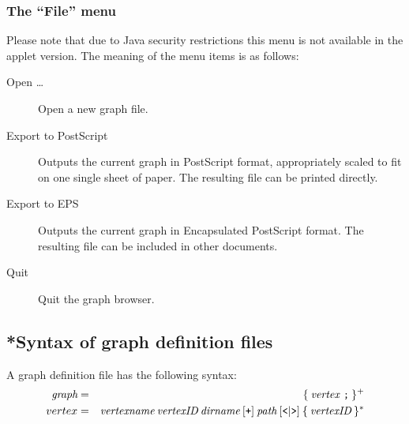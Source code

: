 \subsubsection*{The ``File'' menu}

Please note that due to Java security restrictions this menu is not
available in the applet version. The meaning of the menu items is as
follows:
\begin{description}
  
\item[Open \dots] Open a new graph file.
  
\item[Export to PostScript] Outputs the current graph in {\sc
    PostScript} format, appropriately scaled to fit on one single
  sheet of paper.  The resulting file can be printed directly.
  
\item[Export to EPS] Outputs the current graph in Encapsulated {\sc
    PostScript} format. The resulting file can be included in other
  documents.

\item[Quit] Quit the graph browser.

\end{description}


\subsection*{*Syntax of graph definition files}

A graph definition file has the following syntax:
\begin{eqnarray*}
  \mbox{\it graph} & = & \{ \: \mbox{\it vertex \tt ;} \: \} ^ + \\
  vertex & = & \mbox{\it vertexname} \: \mbox{\it vertexID} \: \mbox{\it dirname} \: [ \mbox{\tt +} ]
  \: \mbox{\it path} \: [ \mbox{\tt <} | \mbox{\tt >} ] \: \{ \: \mbox{\it vertexID} \: \} ^ *
\end{eqnarray*}

